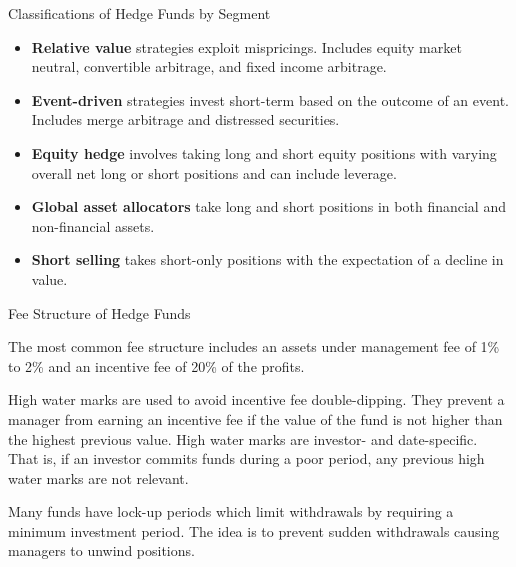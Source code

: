 \documentclass[../custom,grid]{flashcards}
\begin{document}
\begin{flashcard}{Classifications of Hedge Funds by Segment}
    \begin{itemize}
        \item \textbf{Relative value} strategies exploit mispricings. Includes equity market neutral, convertible arbitrage, and fixed income arbitrage.
        \item \textbf{Event-driven} strategies invest short-term based on the outcome of an event. Includes merge arbitrage and distressed securities.
        \item \textbf{Equity hedge} involves taking long and short equity positions with varying overall net long or short positions and can include leverage.
        \item \textbf{Global asset allocators} take long and short positions in both financial and non-financial assets.
        \item \textbf{Short selling} takes short-only positions with the expectation of a decline in value.
    \end{itemize}
\end{flashcard}

\begin{flashcard}{Fee Structure of Hedge Funds}
    \begin{flushleft}
        The most common fee structure includes an assets under management fee of 1\% to 2\% and an incentive fee of 20\% of the profits.\newline

        High water marks are used to avoid incentive fee double-dipping. They prevent a manager from earning an incentive fee if the value of the fund is not higher than the highest previous value. High water marks are investor- and date-specific. That is, if an investor commits funds during a poor period, any previous high water marks are not relevant.\newline

        Many funds have lock-up periods which limit withdrawals by requiring a minimum investment period. The idea is to prevent sudden withdrawals causing managers to unwind positions.
    \end{flushleft}
\end{flashcard}
\end{document}

